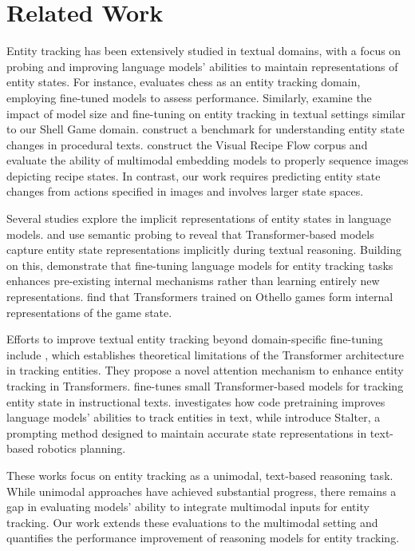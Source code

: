 \section{Related Work}
Entity tracking has been extensively studied in textual domains, with a focus on probing and improving language models' abilities to maintain representations of entity states. For instance, \citet{toshniwal2022chess} evaluates chess as an entity tracking domain, employing fine-tuned models \citep{radford2019language} to assess performance. Similarly, \citet{kim-schuster-2023-entity} examine the impact of model size and fine-tuning on entity tracking in textual settings similar to our Shell Game domain. \citet{tandon-etal-2020-dataset} construct a benchmark for understanding entity state changes in procedural texts. \citet{shirai-etal-2022-visual} construct the Visual Recipe Flow corpus and evaluate the ability of multimodal embedding models to properly sequence images depicting recipe states. In contrast, our work requires predicting entity state changes from actions specified in images and involves larger state spaces.

Several studies explore the implicit representations of entity states in language models. \citet{li-etal-2021-implicit} and \citet{long-etal-2016-simpler} use semantic probing to reveal that Transformer-based models \citep{vaswani2017attention} capture entity state representations implicitly during textual reasoning. Building on this, \citet{prakash2023fine} demonstrate that fine-tuning language models for entity tracking tasks enhances pre-existing internal mechanisms rather than learning entirely new representations. \citet{li2023emergent} find that Transformers trained on Othello games form internal representations of the game state.

Efforts to improve textual entity tracking beyond domain-specific fine-tuning include \citet{fagnou-etal-2024-chain}, which establishes theoretical limitations of the Transformer architecture in tracking entities. They propose a novel attention mechanism to enhance entity tracking in Transformers. \citet{gupta-durrett-2019-effective} fine-tunes small Transformer-based models for tracking entity state in instructional texts. \citet{kim2024codepretrainingimprovesentity} investigates how code pretraining improves language models' abilities to track entities in text, while \citet{yoneda2024statler} introduce Stalter, a prompting method designed to maintain accurate state representations in text-based robotics planning.

These works focus on entity tracking as a unimodal, text-based reasoning task. While unimodal approaches have achieved substantial progress, there remains a gap in evaluating models' ability to integrate multimodal inputs for entity tracking. Our work extends these evaluations to the multimodal setting and quantifies the performance improvement of reasoning models for entity tracking.